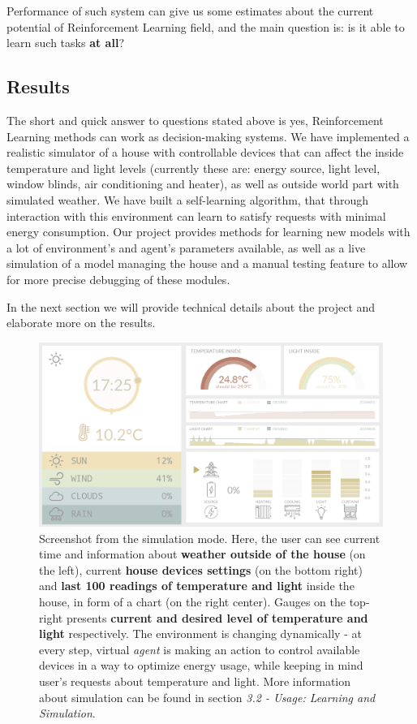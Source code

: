 \documentclass{article}
\begin{document}
Performance of such system can give us some estimates about the current potential of Reinforcement Learning field, and the main question is: is it able to learn such tasks \textbf{at all}?

\subsection{Results}
The short and quick answer to questions stated above is yes, Reinforcement Learning methods can work as decision-making systems. We have implemented a realistic simulator of a house with controllable devices that can affect the inside temperature and light levels (currently these are: energy source, light level, window blinds, air conditioning and heater), as well as outside world part with simulated weather. We have built a self-learning algorithm, that through interaction with this environment can learn to satisfy requests with minimal energy consumption. Our project provides methods for learning new models with a lot of environment's and agent's parameters available, as well as a live simulation of a model managing the house and a manual testing feature to allow for more precise debugging of these modules.

In the next section we will provide technical details about the project and elaborate more on the results.


\begin{figure}[H]
    \begin{center}
        \includegraphics[scale=0.5]{screen.png}
        \caption{Screenshot from the simulation mode. Here, the user can see current time and information about \textbf{weather outside of the house} (on the left), current \textbf{house devices settings} (on the bottom right) and \textbf{last 100 readings of temperature and light} inside the house, in form of a chart (on the right center). Gauges on the top-right presents \textbf{current and desired level of temperature and light} respectively. The environment is changing dynamically - at every step, virtual \textit{agent} is making an action to control available devices in a way to optimize energy usage, while keeping in mind user's requests about temperature and light. More information about simulation can be found in section \textit{3.2 - Usage: Learning and Simulation}. 
        }
    \end{center}
\end{figure}
\end{document}
